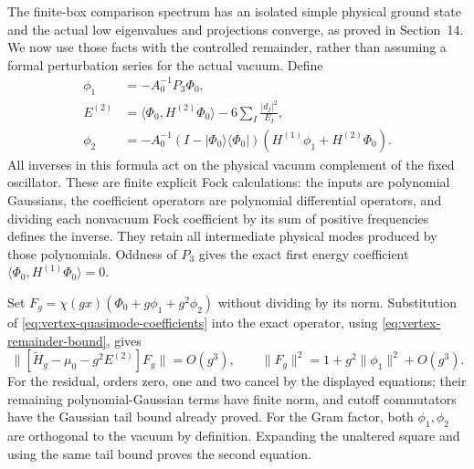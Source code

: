 The finite-box comparison spectrum has an isolated simple physical
ground state and the actual low eigenvalues and projections converge,
as proved in Section~14. We now use those facts with the controlled
remainder, rather than assuming a formal perturbation series for the
actual vacuum. Define
\begin{align}
 \phi_1&=-A_0^{-1}P_3\Phi_0,\nonumber\\
 E^{(2)}&=\langle\Phi_0,H^{(2)}\Phi_0\rangle
                  -6\sum_I\frac{|d_I|^2}{E_I},\nonumber\\
 \phi_2&=-A_0^{-1}(I-|\Phi_0\rangle\langle\Phi_0|)
                       (H^{(1)}\phi_1+H^{(2)}\Phi_0).
       \label{eq:vertex-quasimode-coefficients}
\end{align}
All inverses in this formula act on the physical vacuum complement
of the fixed oscillator. These are finite explicit Fock calculations:
the inputs are polynomial Gaussians, the coefficient operators are
polynomial differential operators, and dividing each nonvacuum Fock
coefficient by its sum of positive frequencies defines the inverse.
They retain all intermediate physical modes produced by those
polynomials. Oddness of $P_3$ gives the exact first energy coefficient
$\langle\Phi_0,H^{(1)}\Phi_0\rangle=0$.

Set $F_g=\chi(gx)(\Phi_0+g\phi_1+g^2\phi_2)$ without dividing
by its norm. Substitution of \eqref{eq:vertex-quasimode-coefficients}
into the exact operator, using \eqref{eq:vertex-remainder-bound}, gives
\begin{equation}\label{eq:vertex-quasimode-residual}
 \|[\widetilde H_g-\mu_0-g^2E^{(2)}]F_g\|=O(g^3),
 \qquad \|F_g\|^2=1+g^2\|\phi_1\|^2+O(g^3).
\end{equation}
For the residual, orders zero, one and two cancel by the displayed
equations; their remaining polynomial-Gaussian terms have finite norm,
and cutoff commutators have the Gaussian tail bound already proved.
For the Gram factor, both $\phi_1,\phi_2$ are orthogonal to the
vacuum by definition. Expanding the unaltered square and using the
same tail bound proves the second equation.


